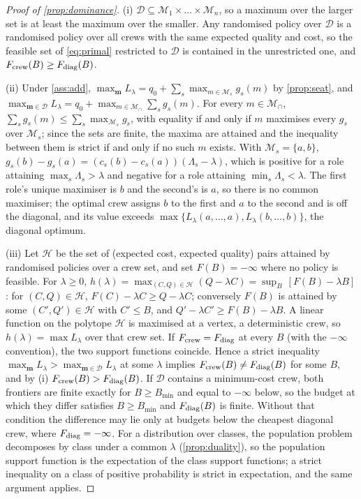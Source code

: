 \documentclass[11pt,a4paper]{article}
\theoremstyle{definition}
\theoremstyle{remark}
\theoremstyle{definition}
\newcommand{\mods}{\mathcal{M}}
\newcommand{\crew}{\mathbf{m}}
\begin{document}
\begin{proof}[Proof of \cref{prop:dominance}]
(i) $\mathcal D\subseteq\mods_1\times\dots\times\mods_n$, so a maximum over the larger set is at least the maximum over the smaller. Any randomised policy over $\mathcal D$ is a randomised policy over all crews with the same expected quality and cost, so the feasible set of \eqref{eq:primal} restricted to $\mathcal D$ is contained in the unrestricted one, and $F_{\rm crew}(B)\ge F_{\rm diag}(B)$.

(ii) Under \cref{ass:add}, $\max_\crew L_\lambda=q_0+\sum_s\max_{m\in\mods_s}g_s(m)$ by \cref{prop:seat}, and $\max_{\crew\in\mathcal D}L_\lambda=q_0+\max_{m\in\mods_\cap}\sum_sg_s(m)$. For every $m\in\mods_\cap$, $\sum_sg_s(m)\le\sum_s\max_{\mods_s} g_s$, with equality if and only if $m$ maximises every $g_s$ over $\mods_s$; since the sets are finite, the maxima are attained and the inequality between them is strict if and only if no such $m$ exists. With $\mods_s=\{a,b\}$, $g_s(b)-g_s(a)=(c_s(b)-c_s(a))(\Lambda_s-\lambda)$, which is positive for a role attaining $\max_s\Lambda_s>\lambda$ and negative for a role attaining $\min_s\Lambda_s<\lambda$. The first role's unique maximiser is $b$ and the second's is $a$, so there is no common maximiser; the optimal crew assigns $b$ to the first and $a$ to the second and is off the diagonal, and its value exceeds $\max\{L_\lambda(a,\dots,a),L_\lambda(b,\dots,b)\}$, the diagonal optimum.

(iii) Let $\mathcal H$ be the set of (expected cost, expected quality) pairs attained by randomised policies over a crew set, and set $F(B)=-\infty$ where no policy is feasible. For $\lambda\ge0$, $h(\lambda)=\max_{(C,Q)\in\mathcal H}(Q-\lambda C)=\sup_B\,[F(B)-\lambda B]$: for $(C,Q)\in\mathcal H$, $F(C)-\lambda C\ge Q-\lambda C$; conversely $F(B)$ is attained by some $(C',Q')\in\mathcal H$ with $C'\le B$, and $Q'-\lambda C'\ge F(B)-\lambda B$. A linear function on the polytope $\mathcal H$ is maximised at a vertex, a deterministic crew, so $h(\lambda)=\max L_\lambda$ over that crew set. If $F_{\rm crew}=F_{\rm diag}$ at every $B$ (with the $-\infty$ convention), the two support functions coincide. Hence a strict inequality $\max_\crew L_\lambda>\max_{\crew\in\mathcal D}L_\lambda$ at some $\lambda$ implies $F_{\rm crew}(B)\ne F_{\rm diag}(B)$ for some $B$, and by (i) $F_{\rm crew}(B)>F_{\rm diag}(B)$. If $\mathcal D$ contains a minimum-cost crew, both frontiers are finite exactly for $B\ge B_{\min}$ and equal to $-\infty$ below, so the budget at which they differ satisfies $B\ge B_{\min}$ and $F_{\rm diag}(B)$ is finite. Without that condition the difference may lie only at budgets below the cheapest diagonal crew, where $F_{\rm diag}=-\infty$. For a distribution over classes, the population problem decomposes by class under a common $\lambda$ (\cref{prop:duality}), so the population support function is the expectation of the class support functions; a strict inequality on a class of positive probability is strict in expectation, and the same argument applies.
\end{proof}
\end{document}
